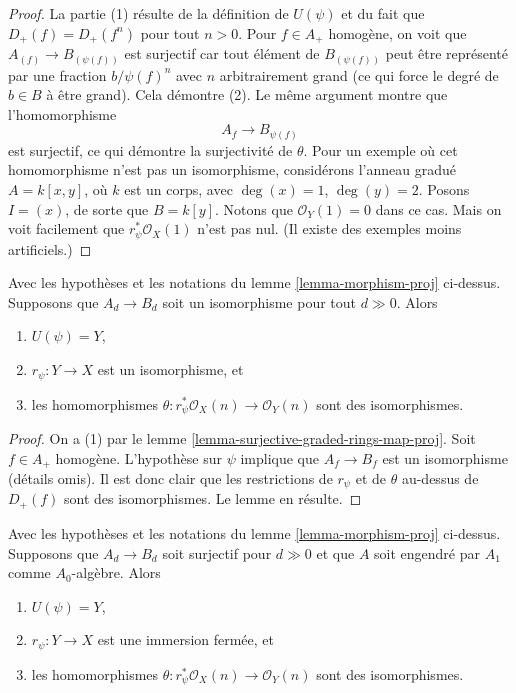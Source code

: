 \begin{proof}
La partie (1) résulte de la définition de $U(\psi)$ et du fait que
$D_{+}(f) = D_{+}(f^n)$ pour tout $n > 0$. Pour $f \in A_{+}$ homogène,
on voit que $A_{(f)} \to B_{(\psi(f))}$ est surjectif car
tout élément de $B_{(\psi(f))}$ peut être représenté par une fraction
$b/\psi(f)^n$ avec $n$ arbitrairement grand (ce qui force le degré de
$b \in B$ à être grand). Cela démontre (2).
Le même argument montre que l'homomorphisme
$$
A_f \to B_{\psi(f)}
$$
est surjectif, ce qui démontre la surjectivité de $\theta$.
Pour un exemple où cet homomorphisme n'est pas un isomorphisme,
considérons l'anneau gradué $A = k[x, y]$, où $k$ est un corps,
avec $\deg(x) = 1$, $\deg(y) = 2$. Posons $I = (x)$, de sorte que
$B = k[y]$. Notons que $\mathcal{O}_Y(1) = 0$ dans ce cas.
Mais on voit facilement que $r_\psi^*\mathcal{O}_X(1)$
n'est pas nul. (Il existe des exemples moins artificiels.)
\end{proof}

\begin{lemma}
\label{lemma-eventual-iso-graded-rings-map-proj}
Avec les hypothèses et les notations du lemme \ref{lemma-morphism-proj} ci-dessus.
Supposons que $A_d \to B_d$ soit un isomorphisme pour tout $d \gg 0$. Alors
\begin{enumerate}
\item $U(\psi) = Y$,
\item $r_\psi : Y \to X$ est un isomorphisme, et
\item les homomorphismes $\theta : r_\psi^*\mathcal{O}_X(n) \to \mathcal{O}_Y(n)$
sont des isomorphismes.
\end{enumerate}
\end{lemma}

\begin{proof}
On a (1) par le lemme \ref{lemma-surjective-graded-rings-map-proj}.
Soit $f \in A_{+}$ homogène. L'hypothèse sur $\psi$ implique que
$A_f \to B_f$ est un isomorphisme (détails omis). Il est donc clair que
les restrictions de $r_\psi$ et de $\theta$ au-dessus de $D_{+}(f)$ sont des isomorphismes.
Le lemme en résulte.
\end{proof}

\begin{lemma}
\label{lemma-surjective-graded-rings-generated-degree-1-map-proj}
Avec les hypothèses et les notations du lemme \ref{lemma-morphism-proj} ci-dessus.
Supposons que $A_d \to B_d$ soit surjectif pour $d \gg 0$ et que $A$ soit engendré
par $A_1$ comme $A_0$-algèbre. Alors
\begin{enumerate}
\item $U(\psi) = Y$,
\item $r_\psi : Y \to X$ est une immersion fermée, et
\item les homomorphismes $\theta : r_\psi^*\mathcal{O}_X(n) \to \mathcal{O}_Y(n)$
sont des isomorphismes.
\end{enumerate}
\end{lemma}

